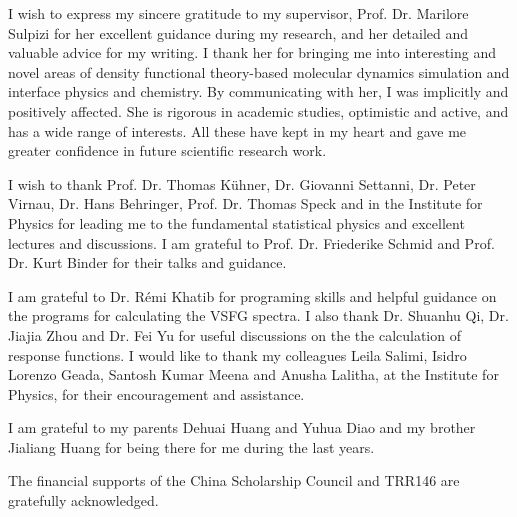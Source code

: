 \documentclass[
11pt, %
english, %
singlespacing, %
headsepline, %
]{MastersDoctoralThesis} %
\newcommand{\I}{I$^{-}$\xspace}
\let\oldAA\AA
\renewcommand{\AA}{\oldAA\xspace}
\newcommand{\A}{\oldAA}
\begin{document}
\begin{abstract}
%
From the results of nonlinear susceptibilities, I conclude that these water molecules at the water/vapor interfaces of LiI, NaI, and KI solutions are participating
in weaker H-bonds, compared with those at the pure water surface.
The origin of the characteristics may come from a unique distribution of \I ions and alkali metal cations,
which form a double layer over the thickness on the order of 5--10 \A.
%
Finally, I obtain that faster rotational anisotropy decay exists for water molecules at the interface of aqueous alkali-iodine solutions, 
which is the result of a different HB types from the usual HB type in pure bulk water. 
This effect on anisotropy decay is due to the H--I bond at the interface.
This difference of HB structure from pure water/vapor interface changed the Im$\chi^{(2),\text{R}}$ spectrum
and the HB dynamics of the interface of alkali-iodine solution.
\end{abstract}


\begin{acknowledgements}
\addchaptertocentry{\acknowledgementname} %
I wish to express my sincere gratitude to my supervisor,
Prof. Dr. Marilore Sulpizi for her excellent guidance during my research, and her detailed and valuable advice for my writing.
I thank her for bringing me into interesting and novel areas of density functional theory-based molecular dynamics simulation 
and interface physics and chemistry. By communicating with her, I was implicitly and positively affected. 
She is rigorous in academic studies, optimistic and active, and has a wide range of interests. 
All these have kept in my heart and gave me greater confidence in future scientific research work.

I wish to thank Prof. Dr. Thomas Kühner, Dr. Giovanni Settanni, Dr. Peter
Virnau, Dr. Hans Behringer, Prof. Dr. Thomas Speck and in the Institute for
Physics for leading me to the fundamental statistical physics and excellent lectures
and discussions. I am grateful to Prof. Dr. Friederike Schmid and Prof. Dr. Kurt
Binder for their talks and guidance.

I am grateful to Dr. R\'emi Khatib for programing skills and helpful guidance on
the programs for calculating the VSFG spectra. I also thank Dr. Shuanhu Qi, Dr. Jiajia Zhou and Dr. Fei Yu for useful discussions 
on the the calculation of response functions. I would like to
thank my colleagues Leila Salimi, Isidro Lorenzo Geada, Santosh Kumar Meena and Anusha Lalitha, 
at the Institute for Physics, for their encouragement and assistance.

I am grateful to my parents Dehuai Huang and Yuhua Diao and my brother Jialiang Huang for being there for me during the
last years.

The financial supports of the China Scholarship Council and TRR146 are gratefully acknowledged.
\end{acknowledgements}
\end{document}
